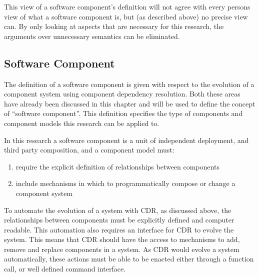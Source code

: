 This view of a software component's definition will not agree with every persons view of what a software component is, but (as described above) no precise view can.
By only looking at aspects that are necessary for this research, the arguments over unnecessary semantics can be eliminated. 

\subsection{Software Component}
The definition of a software component is given with respect to the evolution of a component system using component dependency resolution.
Both these areas have already been discussed in this chapter and will be used to define the concept of ``software component''.
This definition specifies the type of components and component models this research can be applied to.

In this research a software component is a unit of independent deployment, and third party composition,
and a component model must:
\begin{enumerate}
  \item require the explicit definition of relationships between components
  \item include mechanisms in which to programmatically compose or change a component system
\end{enumerate}

To automate the evolution of a system with CDR, as discussed above, the relationships between components must be explicitly defined and computer readable.
This automation also requires an interface for CDR to evolve the system.
This means that CDR should have the access to mechanisms to add, remove and replace components in a system.
As CDR would evolve a system automatically, these actions must be able to be enacted either through a function call, or well defined command interface.

